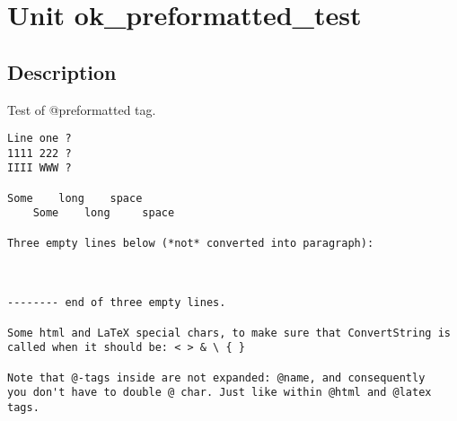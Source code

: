 \documentclass{report}
\begin{document}
\label{toc}\tableofcontents
\newpage
\newlength{\tmplength}
\chapter{Unit ok{\_}preformatted{\_}test}
\label{ok_preformatted_test}
\section{Description}
Test of @preformatted tag.\hfill\vspace*{1ex}



\begin{verbatim}
Line one ?
1111 222 ?
IIII WWW ?

Some    long    space
    Some    long     space

Three empty lines below (*not* converted into paragraph):



-------- end of three empty lines.

Some html and LaTeX special chars, to make sure that ConvertString is
called when it should be: < > & \ { }

Note that @-tags inside are not expanded: @name, and consequently
you don't have to double @ char. Just like within @html and @latex
tags.\end{verbatim}
\end{document}
